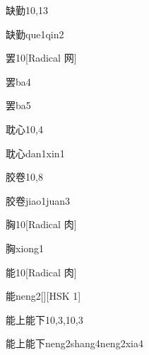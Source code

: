 \begin{entry}{缺勤}{10,13}
  \begin{phonetics}{缺勤}{que1qin2}
  \end{phonetics}
\end{entry}

\begin{entry}{罢}{10}[Radical 网]
  \begin{phonetics}{罢}{ba4}
  \end{phonetics}
  \begin{phonetics}{罢}{ba5}
  \end{phonetics}
\end{entry}

\begin{entry}{耽心}{10,4}
  \begin{phonetics}{耽心}{dan1xin1}
  \end{phonetics}
\end{entry}

\begin{entry}{胶卷}{10,8}
  \begin{phonetics}{胶卷}{jiao1juan3}
  \end{phonetics}
\end{entry}

\begin{entry}{胸}{10}[Radical 肉]
  \begin{phonetics}{胸}{xiong1}
  \end{phonetics}
\end{entry}

\begin{entry}{能}{10}[Radical 肉]
  \begin{phonetics}{能}{neng2}[][HSK 1]
  \end{phonetics}
\end{entry}

\begin{entry}{能上能下}{10,3,10,3}
  \begin{phonetics}{能上能下}{neng2shang4neng2xia4}
  \end{phonetics}
\end{entry}


